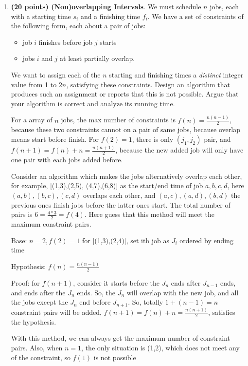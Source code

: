 \documentclass{article}
\newcommand{\thesoln}[1]{}
\newcommand{\thesoln}[1]{{\color{red}\textbf{Solution:} #1}}
\begin{document}
\begin{enumerate}[topsep=0pt]
\begin{enumerate}
\end{enumerate}    

\thesoln{
}

\item  \textbf{(20 points) (Non)overlapping Intervals}. We must schedule $n$ jobs, each with a starting time $s_i$ and a finishing time $f_i$. We have a set of constraints of the following form, each about a pair of jobs:
  \begin{itemize}
  \item job $i$ finishes before job $j$ starts
  \item jobs $i$ and $j$ at least partially overlap.
  \end{itemize}
We want to assign each of the $n$ starting and finishing times a \emph{distinct} integer value from 1 to $2n$, satisfying these constraints. Design an algorithm that produces such an assignment or reports that this is not possible.  Argue that your algorithm is correct and analyze its running time.

For a array of $n$ jobs, the max number of constraints is $f(n)=\frac{n(n-1)}{2}$, because these two constraints cannot on a pair of same jobs, because overlap means start before finish. For $f(2)=1$, there is only $(j_1,j_2)$ pair, and $f(n+1)=f(n)+n=\frac{n(n+1)}{2}$, because the new added job will only have one pair with each jobs added before.

Consider an algorithm which makes the jobs alternatively overlap each other, for example, [(1,3),(2,5), (4,7),(6,8)] as the start/end time of job $a,b,c,d$, here $(a,b),(b,c),(c,d)$ overlaps each other, and $(a,c),(a,d),(b,d)$ the previous ones finish jobs before the latter ones start. The total number of pairs is $6=\frac{4*3}{2}=f(4)$. Here guess that this method will meet the maximum constraint pairs.

Base: $n=2,f(2)=1$ for [(1,3),(2,4)], set ith job as $J_i$ ordered by ending time

Hypothesis: $f(n)=\frac{n(n-1)}{2}$

Proof: for $f(n+1)$, consider it starts before the $J_n$ ends after $J_{n-1}$ ends, and ends after the $J_n$ ends. So, the $J_n$ will overlap with the new job, and all the jobs except the $J_n$ end before $J_{n+1}$. So, totally $1+(n-1)=n$ constraint pairs will be added, $f(n+1)=f(n)+n=\frac{n(n+1)}{2}$, satisfies the hypothesis.

With this method, we can always get the maximum number of constraint pairs. Also, when $n=1$, the only situation is (1,2), which does not meet any of the constraint, so $f(1)$ is not possible


\end{enumerate}
\end{document}
